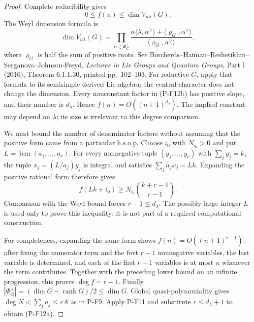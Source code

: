 \documentclass[11pt,a4paper]{article}
\begin{document}
\begin{proof}
Complete reducibility gives
\[
 0\le f(n)\le\dim V_{n\lambda}(G).
\]
The Weyl dimension formula is
\[
 \dim V_{n\lambda}(G)
 =\prod_{\alpha\in\Phi_G^+}
   \frac{n\langle\lambda,\alpha^\vee\rangle
             +\langle\varrho_G,\alpha^\vee\rangle}
        {\langle\varrho_G,\alpha^\vee\rangle},
 \tag{P-F12b}
\]
where $\varrho_G$ is half the sum of positive roots. See
Borcherds--Haiman--Reshetikhin--Serganova--Johnson-Freyd,
\emph{Lectures in Lie Groups and Quantum Groups}, Part I (2016),
Theorem 6.1.1.30, printed pp.~102--103.
For reductive $G$, apply that formula to its semisimple derived Lie
algebra; the central character does not change the dimension.
Every nonconstant factor in (P-F12b) has positive slope, and their
number is $d_\lambda$. Hence $f(n)=O((n+1)^{d_\lambda})$.
The implied constant may depend on $\lambda$; its size is irrelevant to
this degree comparison.

We next bound the number of denominator factors without assuming that
the positive form came from a particular h.s.o.p. Choose $i_0$ with
$N_{i_0}>0$ and put $L=\operatorname{lcm}(a_1,\ldots,a_r)$.
For every nonnegative tuple $(y_1,\ldots,y_r)$ with $\sum_jy_j=k$,
the tuple $x_j=(L/a_j)y_j$ is integral and satisfies
$\sum_ja_jx_j=Lk$. Expanding the positive rational form therefore gives
\[
 f(Lk+i_0)\ge N_{i_0}\binom{k+r-1}{r-1}.
\]
Comparison with the Weyl bound forces $r-1\le d_\lambda$.
The possibly large integer $L$ is used only to prove this inequality;
it is not part of a required computational construction.

For completeness, expanding the same form shows
$f(n)=O((n+1)^{r-1})$: after fixing the numerator term and the first
$r-1$ nonnegative variables, the last variable is determined, and each
of the first $r-1$ variables is at most $n$ whenever the term contributes.
Together with the preceding lower bound on an infinite progression,
this proves $\deg f=r-1$. Finally
$|\Phi_G^+|=(\dim G-\operatorname{rank}G)/2\le\dim G$.
Global quasi-polynomiality gives
$\deg N<\sum_ja_j\le rA$ as in P-F9. Apply P-F11 and substitute
$r\le d_\lambda+1$ to obtain (P-F12a).


\end{proof}
\end{document}
